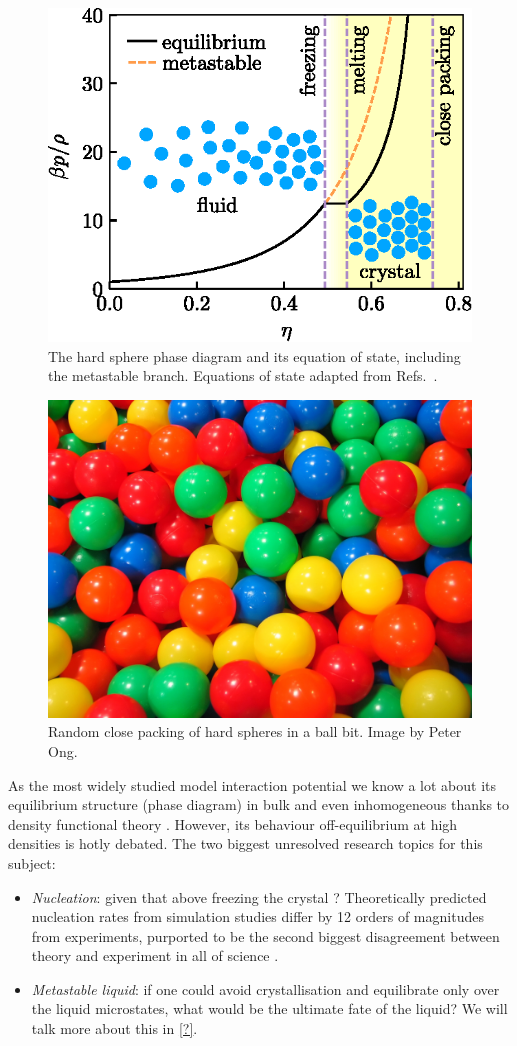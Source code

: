 \documentclass[11pt,twoside]{report}
\begin{document}
\begin{figure}
  \includegraphics[width=0.75\linewidth,outer]{hs-phase-diagram}
  \caption[The hard sphere phase diagram]{
    The hard sphere phase diagram and its equation of state, including the metastable branch.
    Equations of state adapted from Refs.\ \cite{CarnahanJCP1969,SpeedyJPCM1998,BannermanJCP2010}.
  }
  \label{fig:hs-phase-diagram}
\end{figure}

\begin{figure}
  \includegraphics[width=0.75\linewidth,outer]{ball-pit-horizontal}
  \caption[Random close packing in a ball pit]{
    Random close packing of hard spheres in a ball bit.
    Image by Peter Ong.}
  \label{fig:rcp}
\end{figure}

As the most widely studied model interaction potential we know a lot about its equilibrium structure (phase diagram) in bulk and even inhomogeneous thanks to density functional theory \cite{?,?,?}.
However, its behaviour off-equilibrium at high densities is hotly debated.
The two biggest unresolved research topics for this subject:
\begin{itemize}
\item \emph{Nucleation}: given that above freezing the crystal ? Theoretically predicted nucleation rates from simulation studies differ by 12 orders of magnitudes from experiments, purported to be the second biggest disagreement between theory and experiment in all of science \cite{?}.
\item \emph{Metastable liquid}: if one could avoid crystallisation and equilibrate only over the liquid microstates, what would be the ultimate fate of the liquid?
  We will talk more about this in \ref{?}.
\end{itemize}
\end{document}
